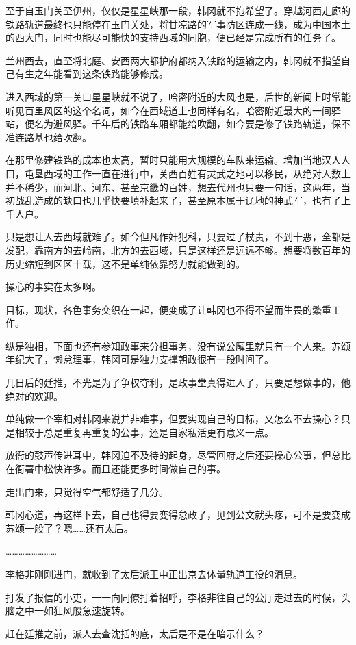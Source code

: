 至于自玉门关至伊州，仅仅是星星峡那一段，韩冈就不抱希望了。穿越河西走廊的铁路轨道最终也只能停在玉门关处，将甘凉路的军事防区连成一线，成为中国本土的西大门，同时也能尽可能快的支持西域的同胞，便已经是完成所有的任务了。

兰州西去，直至将北庭、安西两大都护府都纳入铁路的运输之内，韩冈就不指望自己有生之年能看到这条铁路能够修成。

进入西域的第一关口星星峡就不说了，哈密附近的大风也是，后世的新闻上时常能听见百里风区的这个名词，如今在西域道上也同样有名，哈密附近最大的一间驿站，便名为避风驿。千年后的铁路车厢都能给吹翻，如今要是修了铁路轨道，保不准连路基也给吹翻。

在那里修建铁路的成本也太高，暂时只能用大规模的车队来运输。增加当地汉人人口，屯垦西域的工作一直在进行中，关西百姓有灵武之地可以移民，从绝对人数上并不稀少，而河北、河东、甚至京畿的百姓，想去代州也只要一句话，这两年，当初战乱造成的缺口也几乎快要填补起来了，甚至原本属于辽地的神武军，也有了上千人户。

只是想让人去西域就难了。如今但凡作奸犯科，只要过了杖责，不到十恶，全都是发配，靠南方的去岭南，北方的去西域，只是这样还是远远不够。想要将数百年的历史缩短到区区十载，这不是单纯依靠努力就能做到的。

操心的事实在太多啊。

目标，现状，各色事务交织在一起，便变成了让韩冈也不得不望而生畏的繁重工作。

纵是独相，下面也还有参知政事来分担事务，没有说公廨里就只有一个人来。苏颂年纪大了，懒怠理事，韩冈可是独力支撑朝政很有一段时间了。

几日后的廷推，不光是为了争权夺利，是政事堂真得进人了，只要是想做事的，他绝对的欢迎。

单纯做一个宰相对韩冈来说并非难事，但要实现自己的目标，又怎么不去操心？只是相较于总是重复再重复的公事，还是自家私活更有意义一点。

放衙的鼓声传进耳中，韩冈迫不及待的起身，尽管回府之后还要操心公事，但总比在衙署中松快许多。而且还能更多时间做自己的事。

走出门来，只觉得空气都舒适了几分。

韩冈心道，再这样下去，自己也得要变得怠政了，见到公文就头疼，可不是要变成苏颂一般了？嗯……还有太后。

……………………

李格非刚刚进门，就收到了太后派王中正出京去体量轨道工役的消息。

打发了报信的小吏，一一向同僚打着招呼，李格非往自己的公厅走过去的时候，头脑之中一如狂风般急速旋转。

赶在廷推之前，派人去查沈括的底，太后是不是在暗示什么？

